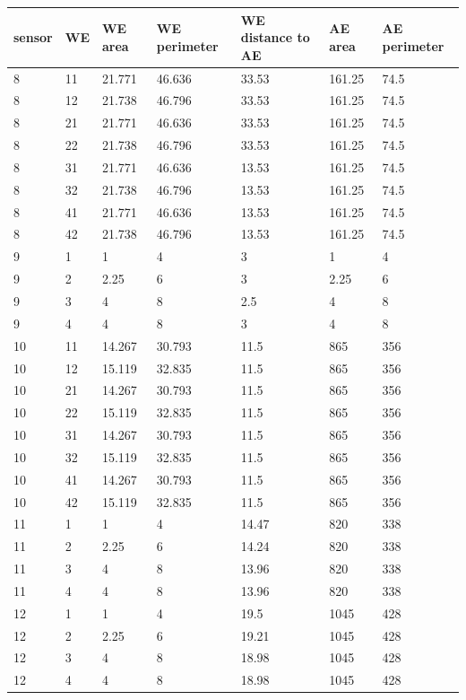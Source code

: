 \begin{table}
	\begin{tabular}{lllllll}
		sensor & WE & WE area & WE perimeter & WE distance to AE & AE area & AE perimeter \\
		\hline
		8 & 11 & 21.771 & 46.636 & 33.53 & 161.25 & 74.5 \\
		8 & 12 & 21.738 & 46.796 & 33.53 & 161.25 & 74.5 \\
		8 & 21 & 21.771 & 46.636 & 33.53 & 161.25 & 74.5 \\
		8 & 22 & 21.738 & 46.796 & 33.53 & 161.25 & 74.5 \\
		8 & 31 & 21.771 & 46.636 & 13.53 & 161.25 & 74.5 \\
		8 & 32 & 21.738 & 46.796 & 13.53 & 161.25 & 74.5 \\
		8 & 41 & 21.771 & 46.636 & 13.53 & 161.25 & 74.5 \\
		8 & 42 & 21.738 & 46.796 & 13.53 & 161.25 & 74.5 \\
		9 & 1 & 1 & 4 & 3 & 1 & 4 \\
		9 & 2 & 2.25 & 6 & 3 & 2.25 & 6 \\
		9 & 3 & 4 & 8 & 2.5 & 4 & 8 \\
		9 & 4 & 4 & 8 & 3 & 4 & 8 \\
		10 & 11 & 14.267 & 30.793 & 11.5 & 865 & 356 \\
		10 & 12 & 15.119 & 32.835 & 11.5 & 865 & 356 \\
		10 & 21 & 14.267 & 30.793 & 11.5 & 865 & 356 \\
		10 & 22 & 15.119 & 32.835 & 11.5 & 865 & 356 \\
		10 & 31 & 14.267 & 30.793 & 11.5 & 865 & 356 \\
		10 & 32 & 15.119 & 32.835 & 11.5 & 865 & 356 \\
		10 & 41 & 14.267 & 30.793 & 11.5 & 865 & 356 \\
		10 & 42 & 15.119 & 32.835 & 11.5 & 865 & 356 \\
		11 & 1 & 1 & 4 & 14.47 & 820 & 338 \\
		11 & 2 & 2.25 & 6 & 14.24 & 820 & 338 \\
		11 & 3 & 4 & 8 & 13.96 & 820 & 338 \\
		11 & 4 & 4 & 8 & 13.96 & 820 & 338 \\
		12 & 1 & 1 & 4 & 19.5 & 1045 & 428 \\
		12 & 2 & 2.25 & 6 & 19.21 & 1045 & 428 \\
		12 & 3 & 4 & 8 & 18.98 & 1045 & 428 \\
		12 & 4 & 4 & 8 & 18.98 & 1045 & 428 \\

\end{tabular}
\end{table}
